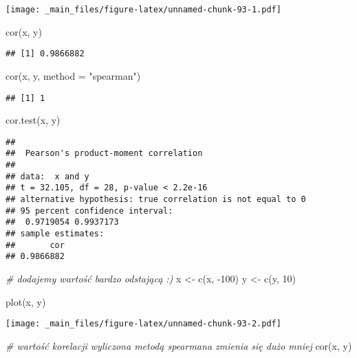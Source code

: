 \documentclass[
]{book}
\newenvironment{Shaded}{\begin{snugshade}}{\end{snugshade}}
\newcommand{\AttributeTok}[1]{\textcolor[rgb]{0.77,0.63,0.00}{#1}}
\newcommand{\CommentTok}[1]{\textcolor[rgb]{0.56,0.35,0.01}{\textit{#1}}}
\newcommand{\DecValTok}[1]{\textcolor[rgb]{0.00,0.00,0.81}{#1}}
\newcommand{\FunctionTok}[1]{\textcolor[rgb]{0.00,0.00,0.00}{#1}}
\newcommand{\NormalTok}[1]{#1}
\newcommand{\OtherTok}[1]{\textcolor[rgb]{0.56,0.35,0.01}{#1}}
\newcommand{\SpecialCharTok}[1]{\textcolor[rgb]{0.00,0.00,0.00}{#1}}
\newcommand{\StringTok}[1]{\textcolor[rgb]{0.31,0.60,0.02}{#1}}
\begin{document}
\texttt{[image: \_main\_files/figure-latex/unnamed-chunk-93-1.pdf]}

\begin{Shaded}
\begin{Highlighting}[]
\FunctionTok{cor}\NormalTok{(x, y)}
\end{Highlighting}
\end{Shaded}

\begin{verbatim}
## [1] 0.9866882
\end{verbatim}

\begin{Shaded}
\begin{Highlighting}[]
\FunctionTok{cor}\NormalTok{(x, y, }\AttributeTok{method =} \StringTok{"spearman"}\NormalTok{)}
\end{Highlighting}
\end{Shaded}

\begin{verbatim}
## [1] 1
\end{verbatim}

\begin{Shaded}
\begin{Highlighting}[]
\FunctionTok{cor.test}\NormalTok{(x, y)}
\end{Highlighting}
\end{Shaded}

\begin{verbatim}
## 
##  Pearson's product-moment correlation
## 
## data:  x and y
## t = 32.105, df = 28, p-value < 2.2e-16
## alternative hypothesis: true correlation is not equal to 0
## 95 percent confidence interval:
##  0.9719054 0.9937173
## sample estimates:
##       cor 
## 0.9866882
\end{verbatim}

\begin{Shaded}
\begin{Highlighting}[]
\CommentTok{\# dodajemy wartość bardzo odstającą :)}
\NormalTok{x }\OtherTok{\textless{}{-}} \FunctionTok{c}\NormalTok{(x, }\SpecialCharTok{{-}}\DecValTok{100}\NormalTok{)}
\NormalTok{y }\OtherTok{\textless{}{-}} \FunctionTok{c}\NormalTok{(y, }\DecValTok{10}\NormalTok{)}

\FunctionTok{plot}\NormalTok{(x, y)}
\end{Highlighting}
\end{Shaded}

\texttt{[image: \_main\_files/figure-latex/unnamed-chunk-93-2.pdf]}

\begin{Shaded}
\begin{Highlighting}[]
\CommentTok{\# wartość korelacji wyliczona metodą spearmana zmienia się dużo mniej}
\FunctionTok{cor}\NormalTok{(x, y)}
\end{Highlighting}
\end{Shaded}
\end{document}
